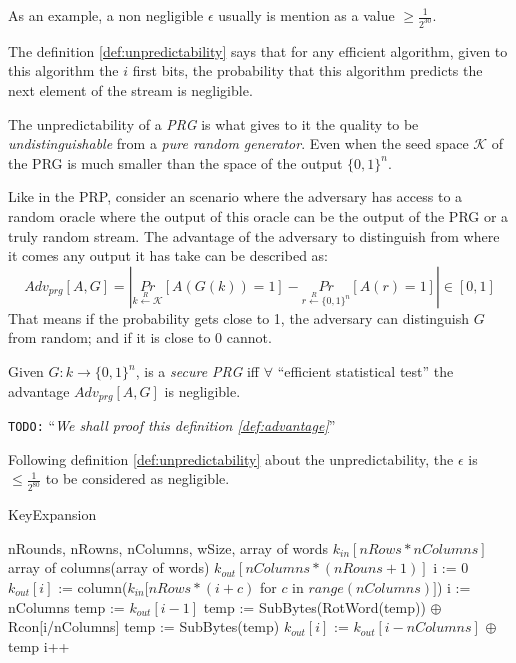 \documentclass[10pt,a4paper,twoside]{llncs}
\newcommand{\todo}[1]{\texttt{\color{red}TODO:} ``\emph{#1}''}
\begin{document}
As an example, a non negligible $\epsilon$ usually is mention as a value $\geqslant\frac{1}{2^{30}}$.

The definition \ref{def:unpredictability} says that for any efficient algorithm, given to this algorithm the $i$ first bits, the probability that this algorithm predicts the next element of the stream is negligible.

The unpredictability of a \emph{PRG} is what gives to it the quality to be \emph{undistinguishable} from a \emph{pure random generator}. Even when the seed space $\mathcal{K}$ of the PRG is much smaller than the space of the output $\{0,1\}^n$.

Like in the PRP, consider an scenario where the adversary has access to a random oracle where the output of this oracle can be the output of the PRG or a truly random stream. The advantage of the adversary to distinguish from where it comes any output it has take can be described as:
\begin{equation}\label{eq:prgAdv}
 {Adv}_{prg}[A,G] = \left|
                     \underset{k\overset{R}{\leftarrow}\mathcal{K}}{Pr}\left[A(G(k))=1\right]-
                     \underset{r\overset{R}{\leftarrow}\{0,1\}^n}{Pr}\left[A(r)=1\right]
                    \right|\in [0,1]
\end{equation}
That means if the probability gets close to 1, the adversary can distinguish $G$ from random; and if it is close to 0 cannot.

\begin{definition}\label{def:advantage}
 Given $G: k \rightarrow \{0,1\}^n$, is a \emph{secure PRG} iff $\forall$ ``efficient statistical test'' the advantage ${Adv}_{prg}[A,G]$ is negligible.
\end{definition}

\todo{We shall proof this definition \ref{def:advantage}}

Following definition \ref{def:unpredictability} about the unpredictability, the $\epsilon$ is $\leqslant\frac{1}{2^{80}}$ to be considered as negligible.

\begin{algorithm}
 \caption{KeyExpansion}
 \label{alg:keyExpansion}
 \begin{algorithmic}[1]
  \REQUIRE nRounds, nRowns, nColumns, wSize, array of words $k_{in}[nRows*nColumns]$
  \ENSURE array of columns(array of words) $k_{out}[nColumns*(nRouns+1)]$
  \STATE i := 0
    \STATE $k_{out}[i]$ := column($k_{in}[nRows*(i+c)$ for $c$ in $range(nColumns)]$)
  \ENDWHILE
  \STATE i := nColumns
    \STATE temp := $k_{out}[i-1]$
      \STATE temp := SubBytes(RotWord(temp)) $\oplus$ Rcon[i/nColumns]
    \ELSE
      \STATE temp := SubBytes(temp)
    \ENDIF
    \STATE $k_{out}[i]$ := $k_{out}[i-nColumns]$ $\oplus$ temp
    \STATE i++
  \ENDWHILE
 \end{algorithmic}
\end{algorithm}
\end{document}
